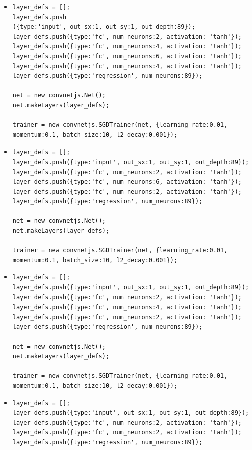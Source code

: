 \begin{itemize}
\item \begin{verbatim}
layer_defs = [];
layer_defs.push
({type:'input', out_sx:1, out_sy:1, out_depth:89});
layer_defs.push({type:'fc', num_neurons:2, activation: 'tanh'});
layer_defs.push({type:'fc', num_neurons:4, activation: 'tanh'});
layer_defs.push({type:'fc', num_neurons:6, activation: 'tanh'});
layer_defs.push({type:'fc', num_neurons:4, activation: 'tanh'});
layer_defs.push({type:'regression', num_neurons:89});

net = new convnetjs.Net();
net.makeLayers(layer_defs);

trainer = new convnetjs.SGDTrainer(net, {learning_rate:0.01, 
momentum:0.1, batch_size:10, l2_decay:0.001});
\end{verbatim}


\item \begin{verbatim}
layer_defs = [];
layer_defs.push({type:'input', out_sx:1, out_sy:1, out_depth:89});
layer_defs.push({type:'fc', num_neurons:2, activation: 'tanh'});
layer_defs.push({type:'fc', num_neurons:6, activation: 'tanh'});
layer_defs.push({type:'fc', num_neurons:2, activation: 'tanh'});
layer_defs.push({type:'regression', num_neurons:89});

net = new convnetjs.Net();
net.makeLayers(layer_defs);

trainer = new convnetjs.SGDTrainer(net, {learning_rate:0.01, 
momentum:0.1, batch_size:10, l2_decay:0.001});
\end{verbatim}


\item \begin{verbatim}
layer_defs = [];
layer_defs.push({type:'input', out_sx:1, out_sy:1, out_depth:89});
layer_defs.push({type:'fc', num_neurons:2, activation: 'tanh'});
layer_defs.push({type:'fc', num_neurons:4, activation: 'tanh'});
layer_defs.push({type:'fc', num_neurons:2, activation: 'tanh'});
layer_defs.push({type:'regression', num_neurons:89});

net = new convnetjs.Net();
net.makeLayers(layer_defs);

trainer = new convnetjs.SGDTrainer(net, {learning_rate:0.01, 
momentum:0.1, batch_size:10, l2_decay:0.001});
\end{verbatim}


\item \begin{verbatim}
layer_defs = [];
layer_defs.push({type:'input', out_sx:1, out_sy:1, out_depth:89});
layer_defs.push({type:'fc', num_neurons:2, activation: 'tanh'});
layer_defs.push({type:'fc', num_neurons:2, activation: 'tanh'});
layer_defs.push({type:'regression', num_neurons:89});


\end{verbatim}
\end{itemize}
